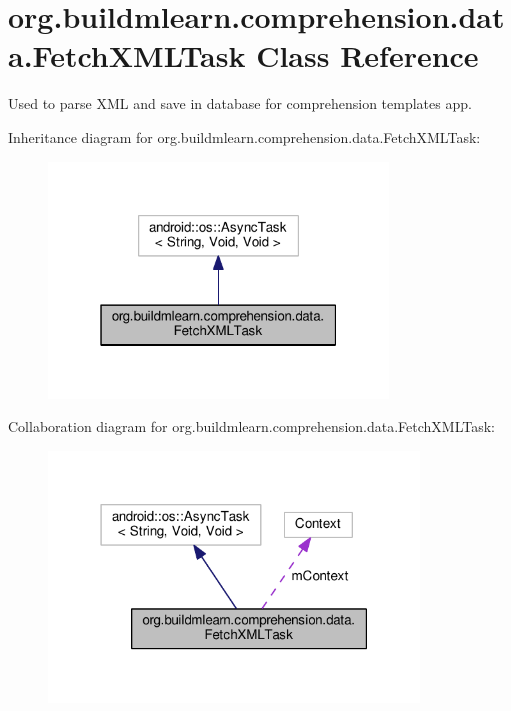 \hypertarget{classorg_1_1buildmlearn_1_1comprehension_1_1data_1_1FetchXMLTask}{}\section{org.\+buildmlearn.\+comprehension.\+data.\+Fetch\+X\+M\+L\+Task Class Reference}
\label{classorg_1_1buildmlearn_1_1comprehension_1_1data_1_1FetchXMLTask}


Used to parse X\+ML and save in database for comprehension template\textquotesingle{}s app.  




Inheritance diagram for org.\+buildmlearn.\+comprehension.\+data.\+Fetch\+X\+M\+L\+Task\+:
\nopagebreak
\begin{figure}[H]
\begin{center}
\leavevmode
\includegraphics[width=256pt]{classorg_1_1buildmlearn_1_1comprehension_1_1data_1_1FetchXMLTask__inherit__graph}
\end{center}
\end{figure}


Collaboration diagram for org.\+buildmlearn.\+comprehension.\+data.\+Fetch\+X\+M\+L\+Task\+:
\nopagebreak
\begin{figure}[H]
\begin{center}
\leavevmode
\includegraphics[width=279pt]{classorg_1_1buildmlearn_1_1comprehension_1_1data_1_1FetchXMLTask__coll__graph}
\end{center}
\end{figure}
